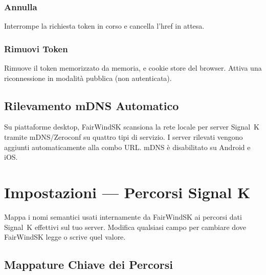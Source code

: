 \subsection{Annulla}

Interrompe la richiesta token in corso e cancella l'href in attesa.

\subsection{Rimuovi Token}

Rimuove il token memorizzato da memoria,  e cookie store del browser.
Attiva una riconnessione in modalità pubblica (non autenticata).

\section{Rilevamento mDNS Automatico}

Su piattaforme desktop, FairWindSK scansiona la rete locale per server Signal~K tramite
mDNS/Zeroconf su quattro tipi di servizio.
I server rilevati vengono aggiunti automaticamente alla combo URL.
mDNS è disabilitato su Android e iOS.

\chapter{Impostazioni --- Percorsi Signal K}
\label{ch:impostazioni-signalk}

Mappa i nomi semantici usati internamente da FairWindSK ai percorsi dati Signal~K
effettivi sul tuo server. Modifica qualsiasi campo per cambiare dove FairWindSK
legge o scrive quel valore.

\section{Mappature Chiave dei Percorsi}

